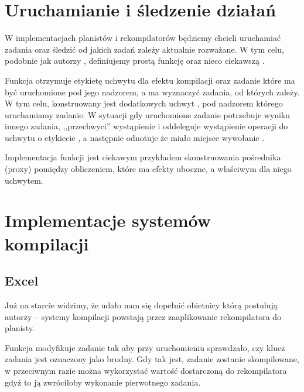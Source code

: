 \section{Uruchamianie i śledzenie działań}

W implementacjach planistów i rekompilatorów będziemy chcieli uruchamiać zadania oraz śledzić od jakich zadań zależy aktualnie rozważane. W tym celu, podobnie jak autorzy \BSaLC{}, definiujemy prostą funkcję  oraz nieco ciekawszą .



Funkcja  otrzymuje etykietę  uchwytu dla efektu kompilacji oraz zadanie  które ma być uruchomione pod jego nadzorem, a  ma wyznaczyć zadania, od których  zależy. W tym celu, konstruowany jest dodatkowych uchwyt , pod nadzorem którego uruchamiamy zadanie. W sytuacji gdy uruchomione zadanie potrzebuje wyniku innego zadania,  ,,przechwyci'' wystąpienie  i oddeleguje wystąpienie operacji do uchwytu o etykiecie , a następnie odnotuje że miało miejsce wywołanie .

Implementacja funkcji  jest ciekawym przykładem skonstruowania pośrednika (proxy) pomiędzy obliczeniem, które ma efekty uboczne, a właściwym dla niego uchwytem.

\pagebreak

\section{Implementacje systemów kompilacji}

\subsection{Excel}



Już na starcie widzimy, że udało nam się dopełnić obietnicy którą postulują autorzy \BSaLC{} -- systemy kompilacji powstają przez zaaplikowanie rekompilatora do planisty.

Funkcja  modyfikuje zadanie tak aby przy uruchomieniu sprawdzało, czy klucz zadania jest oznaczony jako brudny. Gdy tak jest, zadanie zostanie skompilowane, w przeciwnym razie można wykorzystać wartość dostarczoną do rekompilatora gdyż to ją zwróciłoby wykonanie pierwotnego zadania. 

